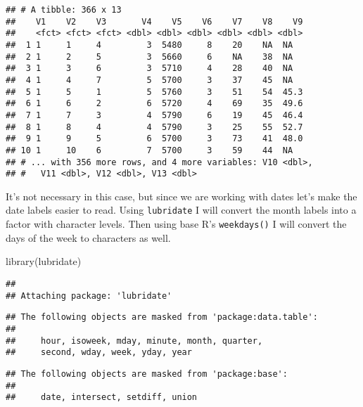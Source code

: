 \documentclass[
]{book}
\newenvironment{Shaded}{\begin{snugshade}}{\end{snugshade}}
\newcommand{\AttributeTok}[1]{\textcolor[rgb]{0.77,0.63,0.00}{#1}}
\newcommand{\ConstantTok}[1]{\textcolor[rgb]{0.00,0.00,0.00}{#1}}
\newcommand{\DecValTok}[1]{\textcolor[rgb]{0.00,0.00,0.81}{#1}}
\newcommand{\FunctionTok}[1]{\textcolor[rgb]{0.00,0.00,0.00}{#1}}
\newcommand{\NormalTok}[1]{#1}
\newcommand{\OtherTok}[1]{\textcolor[rgb]{0.56,0.35,0.01}{#1}}
\newcommand{\SpecialCharTok}[1]{\textcolor[rgb]{0.00,0.00,0.00}{#1}}
\begin{document}
\begin{verbatim}
## # A tibble: 366 x 13
##    V1    V2    V3       V4    V5    V6    V7    V8    V9
##    <fct> <fct> <fct> <dbl> <dbl> <dbl> <dbl> <dbl> <dbl>
##  1 1     1     4         3  5480     8    20    NA  NA  
##  2 1     2     5         3  5660     6    NA    38  NA  
##  3 1     3     6         3  5710     4    28    40  NA  
##  4 1     4     7         5  5700     3    37    45  NA  
##  5 1     5     1         5  5760     3    51    54  45.3
##  6 1     6     2         6  5720     4    69    35  49.6
##  7 1     7     3         4  5790     6    19    45  46.4
##  8 1     8     4         4  5790     3    25    55  52.7
##  9 1     9     5         6  5700     3    73    41  48.0
## 10 1     10    6         7  5700     3    59    44  NA  
## # ... with 356 more rows, and 4 more variables: V10 <dbl>,
## #   V11 <dbl>, V12 <dbl>, V13 <dbl>
\end{verbatim}

It's not necessary in this case, but since we are working with dates let's make the date labels easier to read. Using \texttt{lubridate} I will convert the month labels into a factor with character levels. Then using base R's \texttt{weekdays()} I will convert the days of the week to characters as well.

\begin{Shaded}
\begin{Highlighting}[]
\FunctionTok{library}\NormalTok{(lubridate)}
\end{Highlighting}
\end{Shaded}

\begin{verbatim}
## 
## Attaching package: 'lubridate'
\end{verbatim}

\begin{verbatim}
## The following objects are masked from 'package:data.table':
## 
##     hour, isoweek, mday, minute, month, quarter,
##     second, wday, week, yday, year
\end{verbatim}

\begin{verbatim}
## The following objects are masked from 'package:base':
## 
##     date, intersect, setdiff, union
\end{verbatim}

\begin{Shaded}
\end{Shaded}
\end{document}
